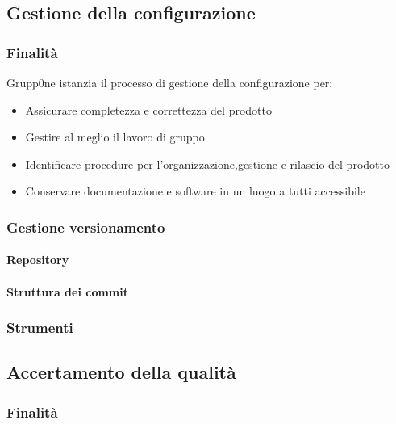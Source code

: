 \documentclass[../norme-di-progetto.tex]{subfiles}
\begin{document}
\subsection{Gestione della configurazione}%
\label{sub:gestione della configurazione}

\subsubsection{Finalità}%
\label{subs:gestione della configurazione/finalita}

Grupp0ne istanzia il processo di gestione della configurazione per:
\begin{itemize}
  \item Assicurare completezza e correttezza del prodotto
  \item Gestire al meglio il lavoro di gruppo
  \item Identificare procedure per l'organizzazione,gestione e rilascio del prodotto
  \item Conservare documentazione e software in un luogo a tutti accessibile
\end{itemize}

\subsubsection{Gestione versionamento}%
\label{subs:gestione versionamento}

\paragraph{Repository}%
\label{par:repository}

\paragraph{Struttura dei commit}%
\label{par:struttura dei commit}

\subsubsection{Strumenti}%
\label{subs:gestione della configurazione/strumenti}

\subsection{Accertamento della qualità}%
\label{subs:accertamento della qualita}

\subsubsection{Finalità}%
\label{subs:accertamento della qualita/finalita}
\end{document}
